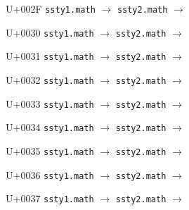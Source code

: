 \documentclass{article}
\begin{document}
\begin{substitutions}
U+002F  \linebreak
    \texttt{ssty1.math} $\to$  \linebreak
    \texttt{ssty2.math} $\to$  

\goodbreak

U+0030  \linebreak
    \texttt{ssty1.math} $\to$  \linebreak
    \texttt{ssty2.math} $\to$  

\goodbreak

U+0031  \linebreak
    \texttt{ssty1.math} $\to$  \linebreak
    \texttt{ssty2.math} $\to$  

\goodbreak

U+0032  \linebreak
    \texttt{ssty1.math} $\to$  \linebreak
    \texttt{ssty2.math} $\to$  

\goodbreak

U+0033  \linebreak
    \texttt{ssty1.math} $\to$  \linebreak
    \texttt{ssty2.math} $\to$  

\goodbreak

U+0034  \linebreak
    \texttt{ssty1.math} $\to$  \linebreak
    \texttt{ssty2.math} $\to$  

\goodbreak

U+0035  \linebreak
    \texttt{ssty1.math} $\to$  \linebreak
    \texttt{ssty2.math} $\to$  

\goodbreak

U+0036  \linebreak
    \texttt{ssty1.math} $\to$  \linebreak
    \texttt{ssty2.math} $\to$  

\goodbreak

U+0037  \linebreak
    \texttt{ssty1.math} $\to$  \linebreak
    \texttt{ssty2.math} $\to$  


\end{substitutions}
\end{document}
